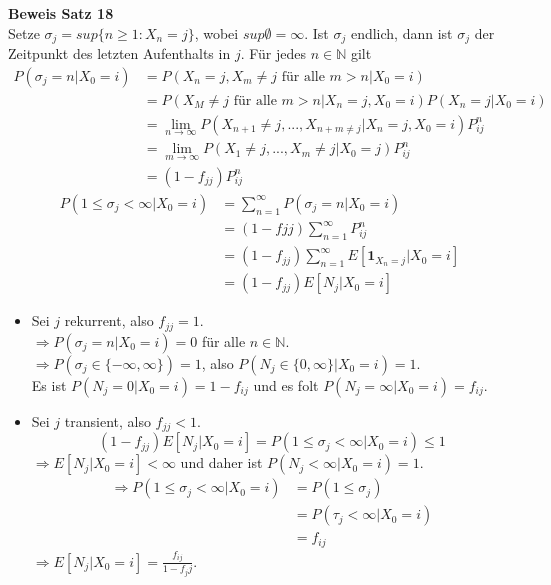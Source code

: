 \documentclass[a4paper,12pt]{article}
\begin{document}
\textbf{Beweis Satz 18}\\
Setze $\sigma_j = sup\{n \geq 1: X_n = j\}$, wobei $sup \emptyset = \infty$.
Ist $\sigma_j$ endlich, dann ist $\sigma_j$ der Zeitpunkt des letzten Aufenthalts in $j$.
Für jedes $n \in \mathbb{N}$ gilt
\begin{align*}
P(\sigma_j = n | X_0 = i) & = P(X_n = j, X_m \neq j \text{ für alle } m>n | X_0 = i) \\
& = P(X_M \neq j \text{ für alle } m>n | X_n = j, X_0 = i)P(X_n = j | X_0 = i) \\
& = \lim_{n \to \infty}P(X_{n+1}\neq j, ..., X_{n+m \neq j}|X_n = j, X_0 = i)P_{ij}^n \\
& = \lim_{m \to \infty}P(X_1 \neq j, ..., X_m \neq j| X_0 = j)P_{ij}^n \\
& = (1-f_{jj})P_{ij}^n
\end{align*}
\begin{align*}
P(1 \leq \sigma_j < \infty | X_0 = i) & = \sum_{n=1}^{\infty}P(\sigma_j = n | X_0 = i) \\
& = (1-f{jj})\sum_{n=1}^{\infty}P_{ij}^n \\
& = (1-f_{jj}) \sum_{n=1}^{\infty}E\left[\textbf{1}_{X_n = j}|X_0 = i\right] \\
& = (1-f_{jj})E \left[N_j|X_0 = i\right]
\end{align*}
\begin{itemize}
\item Sei $j$ rekurrent, also $f_{jj} = 1$.\\
$\Rightarrow P(\sigma_j = n | X_0 = i) = 0$ für alle $n \in \mathbb{N}$.\\
$\Rightarrow P(\sigma_j \in \{- \infty, \infty\}) = 1$, also $P(N_j \in \{0,\infty\}|X_0 = i) = 1$.\\
Es ist $P(N_j = 0 | X_0 = i) = 1- f_{ij}$ und es folt $P(N_j = \infty | X_0 = i) = f_{ij}$.
\item Sei $j$ transient, also $f_{jj} < 1$.
$$
(1-f_{jj})E \left[N_j|X_0 = i\right] = P(1 \leq \sigma_j < \infty | X_0 = i) \leq 1
$$
$\Rightarrow E \left[N_j | X_0 = i\right] < \infty$ und daher ist $P(N_j < \infty | X_0 = i) = 1$.
\begin{align*}
\Rightarrow P(1 \leq \sigma_j < \infty| X_0 = i) & = P(1 \leq \sigma_j)\\
& = P(\tau_j < \infty | X_0 = i)\\
& = f_{ij}
\end{align*}
$\Rightarrow E[N_j | X_0 = i] = \frac{f_{ij}}{1-{f_jj}}$.
\end{itemize}
\end{document}
